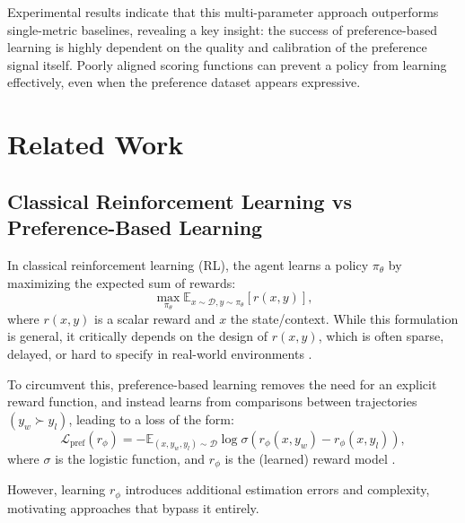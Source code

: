 \documentclass[a4paper,oneside,10pt,ngerman,english]{scrartcl}
\begin{document}
Experimental results indicate that this multi-parameter approach outperforms single-metric baselines, revealing a key insight: the success of preference-based learning is highly dependent on the quality and calibration of the preference signal itself. Poorly aligned scoring functions can prevent a policy from learning effectively, even when the preference dataset appears expressive.





\cleardoubleoddpage

\section{Related Work}
\label{sec:relatedwork}

\subsection{Classical Reinforcement Learning vs Preference-Based Learning}

In classical reinforcement learning (RL), the agent learns a policy $\pi_\theta$ by maximizing the expected sum of rewards:
\[
\max_{\pi_\theta} \mathbb{E}_{x \sim \mathcal{D}, y \sim \pi_\theta} \left[ r(x, y) \right],
\]
where $r(x,y)$ is a scalar reward and $x$ the state/context. While this formulation is general, it critically depends on the design of $r(x, y)$, which is often sparse, delayed, or hard to specify in real-world environments \cite{christiano2017deep, ouyang2022training}. 

To circumvent this, preference-based learning removes the need for an explicit reward function, and instead learns from comparisons between trajectories $(y_w \succ y_l)$, leading to a loss of the form:
\[
\mathcal{L}_{\text{pref}}(r_\phi) = -\mathbb{E}_{(x, y_w, y_l) \sim \mathcal{D}} \log \sigma(r_\phi(x, y_w) - r_\phi(x, y_l)),
\]
where $\sigma$ is the logistic function, and $r_\phi$ is the (learned) reward model \cite{ziegler2019fine, stiennon2020learning}.

However, learning $r_\phi$ introduces additional estimation errors and complexity, motivating approaches that bypass it entirely.
\end{document}
